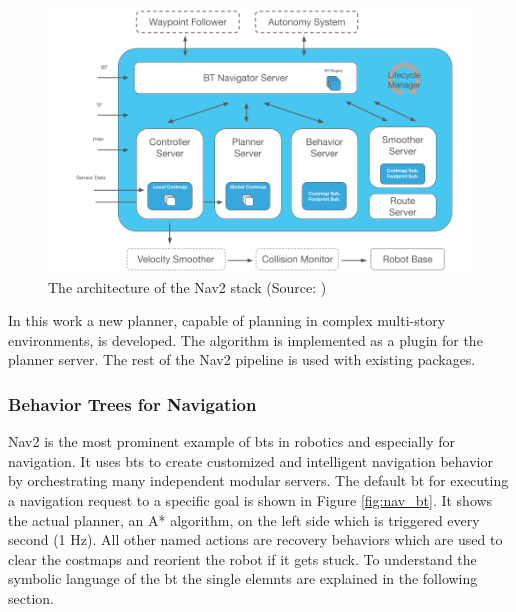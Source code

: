 \begin{figure}[h]
    \centering
    \includegraphics[width=\textwidth]{figures/02_state_of_the_art/nav2_architecture.png}
    \caption{The architecture of the Nav2 stack (Source: \cite{https://navigation.ros.org/})}
    \label{fig:nav2_architecture}
\end{figure}

In this work a new planner, capable of planning in complex multi-story environments, is developed. The algorithm is implemented as a plugin for the planner server. The rest of the Nav2 pipeline is used with existing packages.

\subsubsection{Behavior Trees for Navigation}

Nav2 is the most prominent example of \glspl{bt} in robotics and especially for navigation. It uses \glspl{bt} to create customized and intelligent navigation behavior by orchestrating many independent modular servers. The default \gls{bt} for executing a navigation request to a specific goal is shown in Figure \ref{fig:nav_bt}. It shows the actual planner, an A* algorithm, on the left side which is triggered every second (1 Hz). All other named actions are recovery behaviors which are used to clear the costmaps and reorient the robot if it gets stuck. To understand the symbolic language of the \gls{bt} the single elemnts are explained in the following section.

